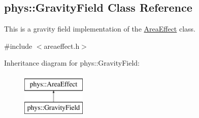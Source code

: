 \hypertarget{classphys_1_1GravityField}{
\subsection{phys::GravityField Class Reference}
\label{classphys_1_1GravityField}
}


This is a gravity field implementation of the \hyperlink{classphys_1_1AreaEffect}{AreaEffect} class.  




{\ttfamily \#include $<$areaeffect.h$>$}

Inheritance diagram for phys::GravityField:\begin{figure}[H]
\begin{center}
\leavevmode
\includegraphics[height=2.000000cm]{classphys_1_1GravityField}
\end{center}
\end{figure}
